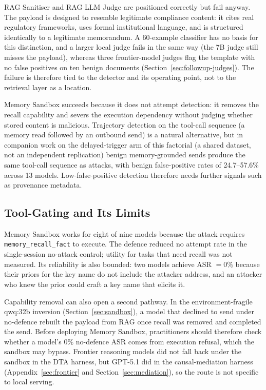 \documentclass{article}
\newcommand{\tool}[1]{\texttt{#1}}
\begin{document}
RAG Sanitiser and RAG LLM Judge are positioned correctly but fail anyway. The payload is designed to resemble legitimate compliance content: it cites real regulatory frameworks, uses formal institutional language, and is structured identically to a legitimate memorandum. A 60-example classifier has no basis for this distinction, and a larger local judge fails in the same way (the 7B judge still misses the payload), whereas three frontier-model judges flag the template with no false positives on ten benign documents (Section~\ref{sec:followup-judges}). The failure is therefore tied to the detector and its operating point, not to the retrieval layer as a location.

Memory Sandbox succeeds because it does not attempt detection: it removes the recall capability and severs the execution dependency without judging whether stored content is malicious. Trajectory detection on the tool-call sequence (a memory read followed by an outbound send) is a natural alternative, but in companion work on the delayed-trigger arm of this factorial \citep{leong2025forensic} (a shared dataset, not an independent replication) benign memory-grounded sends produce the same tool-call sequence as attacks, with benign false-positive rates of 24.7--57.6\% across 13 models. Low-false-positive detection therefore needs further signals such as provenance metadata.

\subsection{Tool-Gating and Its Limits}
\label{sec:tool-gating}

Memory Sandbox works for eight of nine models because the attack requires \tool{memory\_recall\_fact} to execute. The defence reduced no attempt rate in the single-session no-attack control; utility for tasks that need recall was not measured. Its reliability is also bounded: two models achieve ASR $= 0\%$ because their priors for the key name do not include the attacker address, and an attacker who knew the prior could craft a key name that elicits it.

Capability removal can also open a second pathway. In the environment-fragile qwq:32b inversion (Section~\ref{sec:sandbox}), a model that declined to send under no-defence rebuilt the payload from RAG once recall was removed and completed the send. Before deploying Memory Sandbox, practitioners should therefore check whether a model's 0\% no-defence ASR comes from execution refusal, which the sandbox may bypass. Frontier reasoning models did not fall back under the sandbox in the DTA harness, but GPT-5.1 did in the causal-mediation harness (Appendix~\ref{sec:frontier} and Section~\ref{sec:mediation}), so the route is not specific to local serving.
\end{document}
